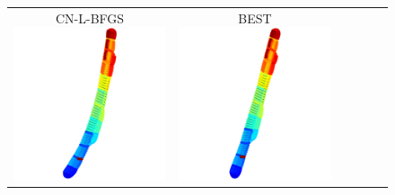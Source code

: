 \documentclass[dvipdfmx,10pt,journal,compsoc]{IEEEtran}
\begin{document}
\begin{figure}[btp]
\begin{tabular}{cccccc}
    \makecell{\small{\textsf{CN-L-BFGS}}                                                                                                                 \\[-0.2em]\includegraphics[width=0.27\columnwidth]{individual/vis/dwt_2680_CN-L-BFGS.png}} &
    \makecell{\small{\textsf{BEST}}                                                                                                                      \\[-0.2em]\includegraphics[width=0.27\columnwidth]{individual/vis/opt_dwt_2680.png}} \\


\end{tabular}
\end{figure}
\end{document}

